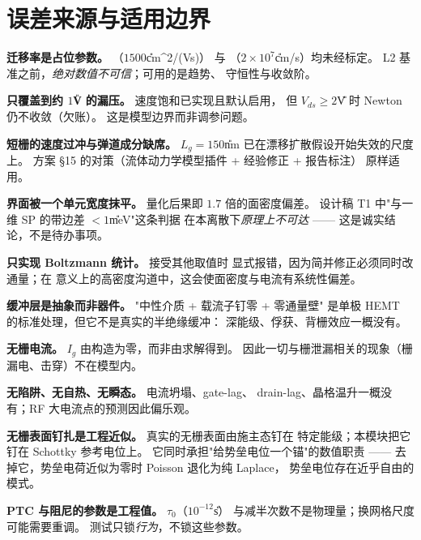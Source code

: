 \section{误差来源与适用边界}
\label{sec:dd-limits}

\limitsheading

\begin{bounds}
  \item \textbf{迁移率是占位参数。} （$1500$\U{cm^2/(V\cdot s)}）
        与 （$2\times10^{7}$\U{cm/s}）均未经标定。
        L2 基准之前，\emph{绝对数值不可信}；可用的是趋势、
        守恒性与收敛阶。

  \item \textbf{只覆盖到约 $1$\U{V} 的漏压。} 速度饱和已实现且默认启用，
        但 $V_{ds}\ge2$\U{V} 时 Newton 仍不收敛（欠账）。
        这是模型边界而非调参问题。

  \item \textbf{短栅的速度过冲与弹道成分缺席。}
        $L_g=150$\U{nm} 已在漂移扩散假设开始失效的尺度上。
        方案 §15 的对策（流体动力学模型插件 + 经验修正 + 报告标注）
        原样适用。

  \item \textbf{界面被一个单元宽度抹平。} 量化后果即 $1.7$ 倍的面密度偏差。
        设计稿 T1 中"与一维 SP 的带边差 $<1$\U{meV}"这条判据
        在本离散下\emph{原理上不可达} —— 这是诚实结论，不是待办事项。

  \item \textbf{只实现 Boltzmann 统计。}  接受其他取值时
        显式报错，因为简并修正必须同时改通量；在 
        意义上的高密度沟道中，这会使面密度与电流有系统性偏差。

  \item \textbf{缓冲层是抽象而非器件。} "中性介质 + 载流子钉零 + 零通量壁"
        是单极 HEMT 的标准处理，但它不是真实的半绝缘缓冲：
        深能级、俘获、背栅效应一概没有。

  \item \textbf{无栅电流。} $I_g$ 由构造为零，而非由求解得到。
        因此一切与栅泄漏相关的现象（栅漏电、击穿）不在模型内。

  \item \textbf{无陷阱、无自热、无瞬态。} 电流坍塌、gate-lag、
        drain-lag、晶格温升一概没有；RF 大电流点的预测因此偏乐观。

  \item \textbf{无栅表面钉扎是工程近似。} 真实的无栅表面由施主态钉在
        特定能级；本模块把它钉在 Schottky 参考电位上。
        它同时承担"给势垒电位一个锚"的数值职责 ——
        去掉它，势垒电荷近似为零时 Poisson 退化为纯 Laplace，
        势垒电位存在近乎自由的模式。

  \item \textbf{PTC 与阻尼的参数是工程值。} $\tau_0$（$10^{-12}$\U{s}）
        与减半次数不是物理量；换网格尺度可能需要重调。
        测试只锁\emph{行为}，不锁这些参数。
\end{bounds}


